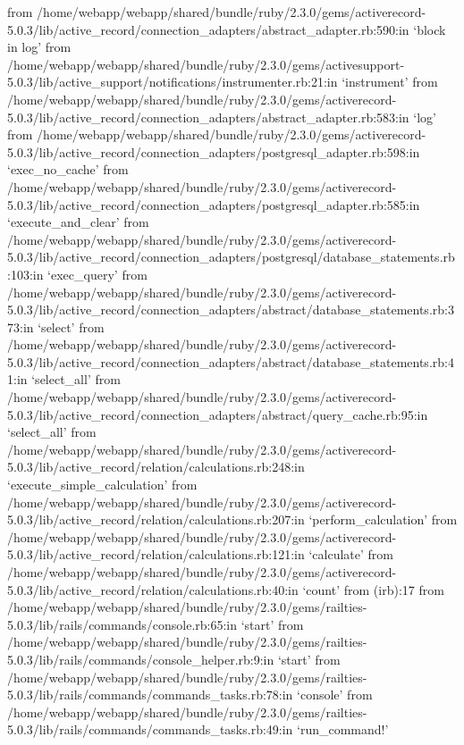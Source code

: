         from /home/webapp/webapp/shared/bundle/ruby/2.3.0/gems/activerecord-5.0.3/lib/active_record/connection_adapters/abstract_adapter.rb:590:in `block in log'
        from /home/webapp/webapp/shared/bundle/ruby/2.3.0/gems/activesupport-5.0.3/lib/active_support/notifications/instrumenter.rb:21:in `instrument'
        from /home/webapp/webapp/shared/bundle/ruby/2.3.0/gems/activerecord-5.0.3/lib/active_record/connection_adapters/abstract_adapter.rb:583:in `log'
        from /home/webapp/webapp/shared/bundle/ruby/2.3.0/gems/activerecord-5.0.3/lib/active_record/connection_adapters/postgresql_adapter.rb:598:in `exec_no_cache'
        from /home/webapp/webapp/shared/bundle/ruby/2.3.0/gems/activerecord-5.0.3/lib/active_record/connection_adapters/postgresql_adapter.rb:585:in `execute_and_clear'
        from /home/webapp/webapp/shared/bundle/ruby/2.3.0/gems/activerecord-5.0.3/lib/active_record/connection_adapters/postgresql/database_statements.rb:103:in `exec_query'
        from /home/webapp/webapp/shared/bundle/ruby/2.3.0/gems/activerecord-5.0.3/lib/active_record/connection_adapters/abstract/database_statements.rb:373:in `select'
        from /home/webapp/webapp/shared/bundle/ruby/2.3.0/gems/activerecord-5.0.3/lib/active_record/connection_adapters/abstract/database_statements.rb:41:in `select_all'
        from /home/webapp/webapp/shared/bundle/ruby/2.3.0/gems/activerecord-5.0.3/lib/active_record/connection_adapters/abstract/query_cache.rb:95:in `select_all'
        from /home/webapp/webapp/shared/bundle/ruby/2.3.0/gems/activerecord-5.0.3/lib/active_record/relation/calculations.rb:248:in `execute_simple_calculation'
        from /home/webapp/webapp/shared/bundle/ruby/2.3.0/gems/activerecord-5.0.3/lib/active_record/relation/calculations.rb:207:in `perform_calculation'
        from /home/webapp/webapp/shared/bundle/ruby/2.3.0/gems/activerecord-5.0.3/lib/active_record/relation/calculations.rb:121:in `calculate'
        from /home/webapp/webapp/shared/bundle/ruby/2.3.0/gems/activerecord-5.0.3/lib/active_record/relation/calculations.rb:40:in `count'
        from (irb):17
        from /home/webapp/webapp/shared/bundle/ruby/2.3.0/gems/railties-5.0.3/lib/rails/commands/console.rb:65:in `start'
        from /home/webapp/webapp/shared/bundle/ruby/2.3.0/gems/railties-5.0.3/lib/rails/commands/console_helper.rb:9:in `start'
        from /home/webapp/webapp/shared/bundle/ruby/2.3.0/gems/railties-5.0.3/lib/rails/commands/commands_tasks.rb:78:in `console'
        from /home/webapp/webapp/shared/bundle/ruby/2.3.0/gems/railties-5.0.3/lib/rails/commands/commands_tasks.rb:49:in `run_command!'
